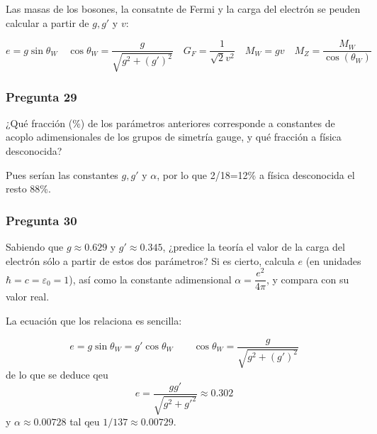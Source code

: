 Las masas de los bosones, la consatnte de Fermi y la carga del electrón se peuden calcular a partir de $g,g'$ y $v$:

\begin{equation}
	e = g \sin \theta_W \quad \cos \theta_W = \frac{g}{\sqrt{g^2 + (g')^2}} \quad G_F = \frac{1}{\sqrt{2} v^2 } \quad M_W = g v \quad M_Z  = \frac{M_W}{\cos (\theta_W)}
\end{equation}

\vspace*{2em}

\begin{Enunciado}
	\subsubsection*{Pregunta 29}

	¿Qué fracción (\%) de los parámetros anteriores corresponde a constantes de acoplo adimensionales de los grupos de simetría gauge, y qué fracción a física desconocida?

\end{Enunciado}

Pues serían las constantes $g,g'$ y $\alpha$, por lo que 2/18=12\% a física desconocida el resto 88\%.  
\vspace*{2em}

\begin{Enunciado}
	\subsubsection*{Pregunta 30}

	Sabiendo que $g \approx 0.629$ y $g' \approx 0.345$, ¿predice la teoría el valor de la carga del electrón sólo a partir de estos dos parámetros? Si es cierto, calcula $e$ (en unidades $\hbar = c = \varepsilon_0 = 1$), así como la constante adimensional $\alpha = \dfrac{e^2}{4\pi}$, y compara con su valor real.

\end{Enunciado}

La ecuación que los relaciona es sencilla:

\begin{equation}
	e = g \sin \theta_W  = g' \cos \theta_W \qquad \cos \theta_W = \frac{g}{\sqrt{g^2 + (g')^2}}
\end{equation}
de lo que se deduce qeu
\begin{equation}
	e = \frac{gg'}{\sqrt{g^2 + g'^2}} \approx 0.302
\end{equation}
y $\alpha\approx 0.00728$ tal qeu $1/137 \approx 0.00729$. 


\vspace*{2em}
